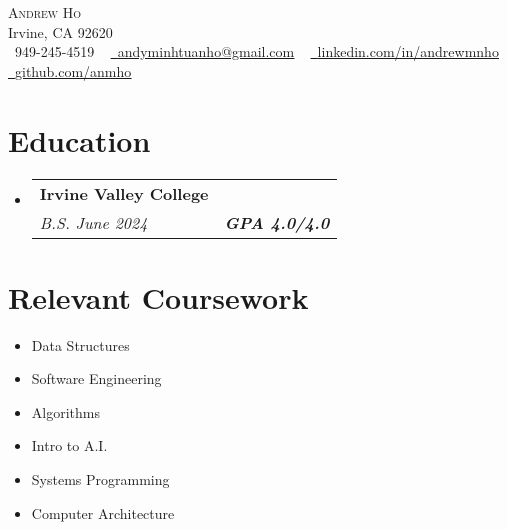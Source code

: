 \documentclass[letterpaper,11pt]{article}
\makeatletter
\newcommand{\resumeSubheading}[4]{
  \vspace{-2pt}\item
    \begin{tabular*}{1.0\textwidth}[t]{l@{\extracolsep{\fill}}r}
      \textbf{#1} & \textbf{\small #2} \\
      \textit{\small#3} & \textit{\small #4} \\
    \end{tabular*}\vspace{-7pt}
}
\newcommand{\resumeSubHeadingListStart}{\begin{itemize}[leftmargin=0.0in, label={}]}
\newcommand{\resumeSubHeadingListEnd}{\end{itemize}}
\makeatother
\begin{document}

\begin{center}
    {\Huge \scshape Andrew Ho} \\ \vspace{1pt}
    Irvine, CA 92620 \\ \vspace{1pt}
    \small \raisebox{-0.1\height}\faPhone\ 949-245-4519 ~ \href{mailto:x@gmail.com}{\raisebox{-0.2\height}\faEnvelope\  \underline{andyminhtuanho@gmail.com}} ~
    \href{https://linkedin.com/in/andrewmnho/}{\raisebox{-0.2\height}\faLinkedin\ \underline{linkedin.com/in/andrewmnho}}  ~
    \href{https://github.com/}{\raisebox{-0.2\height}\faGithub\ \underline{github.com/anmho}}
    \vspace{-8pt}
\end{center}


\section{Education}
\resumeSubHeadingListStart
\resumeSubheading
{Irvine Valley College \normalfont{\small{-- Irvine, CA}}}{\normalfont{Computer Science}}
{B.S. June 2024}{\textbf{GPA 4.0/4.0}}
\resumeSubHeadingListEnd

\section{Relevant Coursework}
\begin{multicols}{4}
    \begin{itemize}[itemsep=-5pt, parsep=3pt]
        \item\small Data Structures
        \item Software Engineering
        \item Algorithms
        \item Intro to A.I.
        \item Systems Programming
        \item Computer Architecture
    \end{itemize}
\end{multicols}
\vspace*{2.0\multicolsep}
\end{document}
